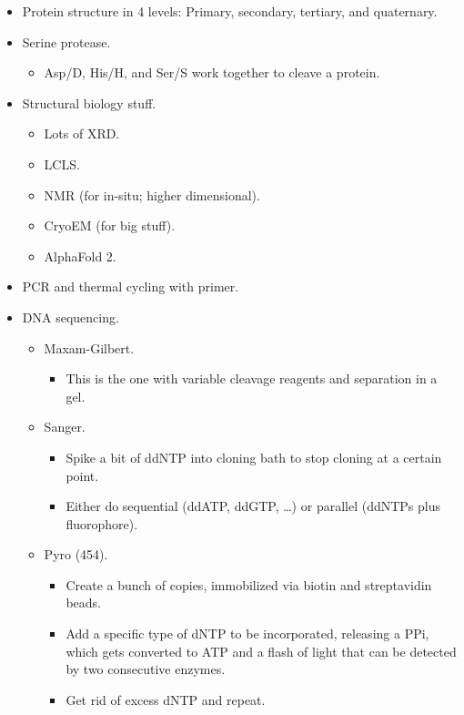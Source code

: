 \documentclass[../notes.tex]{subfiles}
\begin{document}
\begin{itemize}
\begin{itemize}
\begin{itemize}
        \end{itemize}
    \end{itemize}
    \item Protein structure in 4 levels: Primary, secondary, tertiary, and quaternary.
    \item Serine protease.
    \begin{itemize}
        \item Asp/D, His/H, and Ser/S work together to cleave a protein.
    \end{itemize}
    \item Structural biology stuff.
    \begin{itemize}
        \item Lots of XRD.
        \item LCLS.
        \item NMR (for in-situ; higher dimensional).
        \item CryoEM (for big stuff).
        \item AlphaFold 2.
    \end{itemize}
    \item PCR and thermal cycling with primer.
    \item DNA sequencing.
    \begin{itemize}
        \item Maxam-Gilbert.
        \begin{itemize}
            \item This is the one with variable cleavage reagents and separation in a gel.
        \end{itemize}
        \item Sanger.
        \begin{itemize}
            \item Spike a bit of ddNTP into cloning bath to stop cloning at a certain point.
            \item Either do sequential (ddATP, ddGTP, \dots) or parallel (ddNTPs plus fluorophore).
        \end{itemize}
        \item Pyro (454).
        \begin{itemize}
            \item Create a bunch of copies, immobilized via biotin and streptavidin beads.
            \item Add a specific type of dNTP to be incorporated, releasing a PPi, which gets converted to ATP and a flash of light that can be detected by two consecutive enzymes.
            \item Get rid of excess dNTP and repeat.

\end{itemize}
\end{itemize}
\end{itemize}
\end{document}
